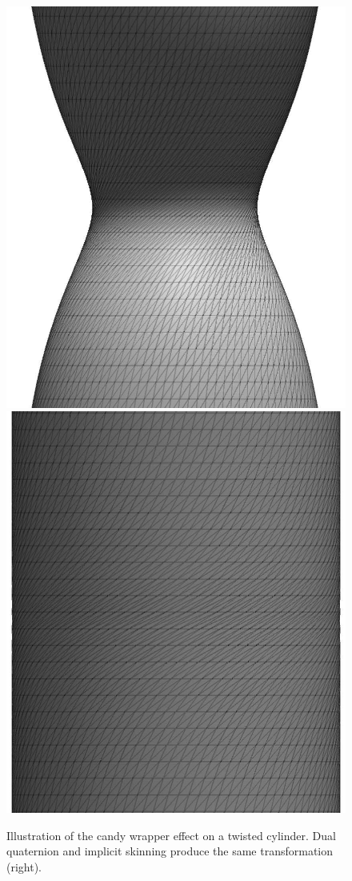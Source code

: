 \documentclass[a4paper,10pt]{article}
\begin{document}
\begin{multicols}{2}
\begin{figure}[H]
\centering
\includegraphics[height=0.15\textheight]{figs/twisted_linear}
\includegraphics[height=0.15\textheight]{figs/twisted_implicit}
\caption{Illustration of the candy wrapper effect on a twisted cylinder.
Dual quaternion and implicit skinning produce the same transformation (right).}
\end{figure}


\end{multicols}
\end{document}
